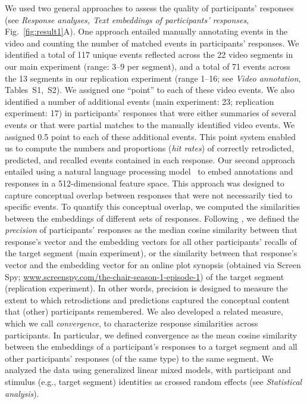 \documentclass[10pt]{article}
\newcommand{\stimDescription}{S1}
\newcommand{\stimDescriptionRep}{S2}
\begin{document}
We used two general approaches to assess the quality of participants' responses (see \textit{Response analyses, Text embeddings of participants’ responses}, Fig.~\ref{fig:result1}A). One approach entailed manually annotating events in the video and counting the number of matched events in participants' responses. We identified a total of 117 unique events reflected across the 22 video segments in our main experiment (range: 3--9 per segment), and a total of 71 events across the 13 segments in our replication experiment (range 1--16; see \textit{Video annotation}, Tables~\stimDescription,~\stimDescriptionRep). We assigned one ``point'' to each of these video events. We also identified a number of additional events (main experiment: 23; replication experiment: 17) in participants' responses that were either summaries of several events or that were partial matches to the manually identified video events. We assigned 0.5 point to each of these additional events. This point system enabled us to compute the numbers and proportions (\textit{hit rates}) of correctly retrodicted, predicted, and recalled events contained in each response. Our second approach entailed using a natural language processing model~\citep{CerEtal18} to embed annotations and responses in a 512-dimensional feature space. This approach was designed to capture conceptual overlap between responses that were not necessarily tied to specific events. To quantify this conceptual overlap, we computed the similarities between the embeddings of different sets of responses. Following \cite{HeusEtal21}, we defined the \textit{precision} of participants' responses as the median cosine similarity between that response's vector and the embedding vectors for all other participants' recalls of the target segment (main experiment), or the similarity between that response's vector and the embedding vector for an online plot synopsis (obtained via Screen Spy; \url{www.screenspy.com/the-chair-season-1-episode-1}) of the target segment (replication experiment).  In other words, precision is designed to measure the extent to which retrodictions and predictions captured the conceptual content that (other) participants remembered. We also developed a related measure, which we call \textit{convergence}, to characterize response similarities across participants. In particular, we defined convergence as the mean cosine similarity between the embeddings of a participant's responses to a target segment and all other participants' responses (of the same type) to the same segment. We analyzed the data using generalized linear mixed models, with participant and stimulus (e.g., target segment) identities as crossed random effects (see \textit{Statistical analysis}).
\end{document}
